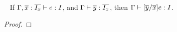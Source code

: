 \begin{lemma}~\label{lemma:subst_type_preservation}
If $\Gamma, \overline{x}:\overline{I_x} \; {\vdash} \;  e : I$, and
$\Gamma \; {\vdash} \; \overline{y}:\overline{I_x}$, then
$\Gamma \; {\vdash} \; [\overline{y}/\overline{x}]e : I$.

\begin{proof}


	
	  


\end{proof}

\end{lemma}

